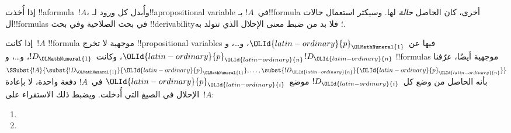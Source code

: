 \documentclass[../../../include/open-logic-section]{subfiles}
\begin{document}


إذا أُخذت !!a{formula}~$!A$، وأُبدل كل ورود لـ!!a{propositional variable}
في~$!A$ بـ!!{formula} أخرى، كان الحاصل \emph{حالة} لها. وسيكثر
استعمال حالات ال!!{formula}s في بحث الصلاحية وفي بحث
!!{derivability}؛ فلا بد من ضبط معنى الإحلال الذي تتولد به.

\begin{defn}
  إذا كانت~$!A$ !!{formula} موجهية لا تخرج !!{propositional
    variable}s فيها عن~$\OLId{latin-ordinary}{p}_\OLMathNumeral{1}$، و\dots، و$\OLId{latin-ordinary}{p}_\OLId{latin-ordinary}{n}$، وكانت~$!D_\OLMathNumeral{1}$، و\dots،
  و$!D_\OLId{latin-ordinary}{n}$ !!{formula}s موجهية أيضًا، عرّفنا
  $\SSubst{!A}{\subst{!D_\OLMathNumeral{1}}{\OLId{latin-ordinary}{p}_\OLMathNumeral{1}}, \dots, \subst{!D_\OLId{latin-ordinary}{n}}{\OLId{latin-ordinary}{p}_\OLId{latin-ordinary}{n}}}$ بأنه
  الحاصل من وضع كل~$!D_\OLId{latin-ordinary}{i}$ موضع~$\OLId{latin-ordinary}{p}_\OLId{latin-ordinary}{i}$ في~$!A$ دفعة واحدة،
  لا بإعادة الإحلال في الصيغ التي أُدخلت. ويضبط ذلك الاستقراء على~$!A$:
  \begin{enumerate}
    \item {}
    \item {}
\end{enumerate}
\end{defn}
\end{document}
